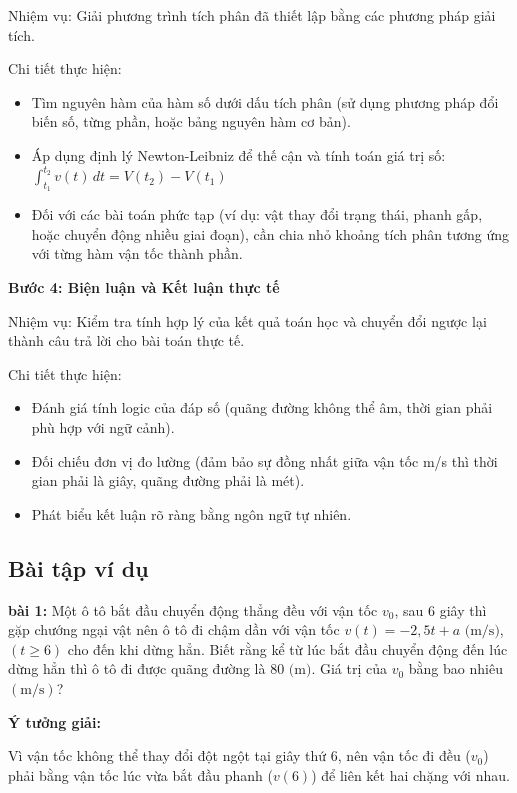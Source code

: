 \documentclass[12pt,a4paper,oneside]{book}
\theoremstyle{theorem}
\theoremstyle{definition}
\begin{document}
Nhiệm vụ: Giải phương trình tích phân đã thiết lập bằng các phương pháp giải tích.

Chi tiết thực hiện:
\begin{itemize}
    \item Tìm nguyên hàm của hàm số dưới dấu tích phân (sử dụng phương pháp đổi biến số, từng phần, hoặc bảng nguyên hàm cơ bản).
    \item Áp dụng định lý Newton-Leibniz để thế cận và tính toán giá trị số:$\int _{t_{1}}^{t_{2}}v(t)\,dt=V(t_{2})-V(t_{1})$
    \item Đối với các bài toán phức tạp (ví dụ: vật thay đổi trạng thái, phanh gấp, hoặc chuyển động nhiều giai đoạn), cần chia nhỏ khoảng tích phân tương ứng với từng hàm vận tốc thành phần.
\end{itemize}

\textbf{Bước 4: Biện luận và Kết luận thực tế}

Nhiệm vụ: Kiểm tra tính hợp lý của kết quả toán học và chuyển đổi ngược lại thành câu trả lời cho bài toán thực tế.

Chi tiết thực hiện:
\begin{itemize}
    \item Đánh giá tính logic của đáp số (quãng đường không thể âm, thời gian phải phù hợp với ngữ cảnh).
    \item Đối chiếu đơn vị đo lường (đảm bảo sự đồng nhất giữa vận tốc m/s thì thời gian phải là giây, quãng đường phải là mét).
    \item Phát biểu kết luận rõ ràng bằng ngôn ngữ tự nhiên.
\end{itemize}
\subsection{Bài tập ví dụ}
\noindent\textbf{bài 1:} Một ô tô bắt đầu chuyển động thẳng đều với vận tốc $v_0$, sau $6$ giây thì gặp chướng ngại vật nên ô tô đi chậm dần với vận tốc $v(t) = -2,5t + a \text{ (m/s)}$, $(t \ge 6)$ cho đến khi dừng hẳn. Biết rằng kể từ lúc bắt đầu chuyển động đến lúc dừng hẳn thì ô tô đi được quãng đường là $80\text{ (m)}$. Giá trị của $v_0$ bằng bao nhiêu $(\text{m/s})$?

\begin{center}
    \textbf{Ý tưởng giải:}
\end{center} 

Vì vận tốc không thể thay đổi đột ngột tại giây thứ 6, nên vận tốc đi đều ($v_{0}$) phải bằng vận tốc lúc vừa bắt đầu phanh ($v(6)$) để liên kết hai chặng với nhau.
\end{document}
